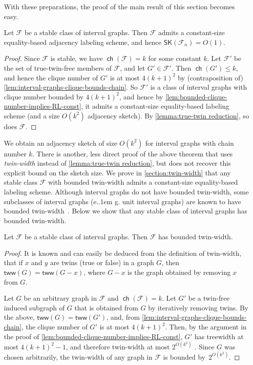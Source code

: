 \documentclass{theoretics}
\makeatletter
\newcommand{\cF}{\ensuremath{\mathcal{F}}}
\newcommand{\tw}{\mathsf{tww}}
\newcommand*\eg{e.\kern.1em g.\@\xspace} %
\newcommand{\RL}{\mathsf{SK}}
\DeclareMathOperator\ch{\mathsf{ch}}
\makeatother
\begin{document}
With these preparations, the proof of the main result of this section becomes easy.

\begin{theorem}
\label{thm:interval graphs}
Let $\cF$  be a stable class of interval graphs.
Then $\cF$ admits a constant-size equality-based adjacency labeling scheme, and hence $\RL(\cF_n) = O(1)$.
\end{theorem}
\begin{proof}
Since $\cF$ is stable, we have $\ch(\cF) = k$ for some constant $k$. Let $\cF'$ be the set of
true-twin-free members of $\cF$, and let $G' \in \cF'$. Then $\ch(G')\leq k$, and hence the clique
number of $G'$ is at most $4(k+1)^2$ by (contraposition of)
\cref{lem:interval-graphs-clique-bounds-chain}. So $\cF'$ is a class of interval graphs with clique
number bounded by $4(k+1)^2$, and hence by \cref{lem:bounded-clique-number-implies-RL-const}, it
admits a constant-size equality-based labeling scheme (and a size $O(k^2)$ adjacency sketch). By
\cref{lemma:true-twin reduction}, so does $\cF$.
\end{proof}

\begin{remark}
We obtain an adjacency sketch of size $O(k^2)$ for interval graphs with chain number $k$.  There is
another, less direct proof of the above theorem that uses \emph{twin-width} instead of
\cref{lemma:true-twin reduction}, but does not recover this explicit bound on the sketch size. We
prove in \cref{section:twin-width} that any stable class $\cF$ with bounded twin-width admits a
constant-size equality-based labeling scheme. Although interval graphs do not have bounded
twin-width, some subclasses of interval graphs (\eg unit interval graphs) are known to have
bounded twin-width~\cite{BKTW20}. Below we show that any stable class of interval graphs has bounded
twin-width. 
\end{remark}

\begin{proposition}
\label{prop:stable interval twin-width}
Let $\cF$ be a stable class of interval graphs. Then $\cF$ has bounded twin-width.
\end{proposition}
\begin{proof}
It is known and can easily be deduced from the definition of twin-width, that if $x$ and $y$ are twins (true or false) in a graph $G$, then $\tw(G) = \tw(G-x)$, where $G-x$ is the graph obtained by removing $x$ from $G$.

Let $G$ be an arbitrary graph in $\cF$ and $\ch(\cF) = k$. Let $G'$ be a twin-free induced subgraph of $G$ that is obtained from $G$ by iteratively removing twins. By the above, $\tw(G) = \tw(G')$, and, from \cref{lem:interval-graphs-clique-bounds-chain}, the clique number of $G'$ is at most $4(k+1)^2$. 
Then, by the argument in the proof of
\cref{lem:bounded-clique-number-implies-RL-const}, $G'$ has treewidth at most $4(k+1)^2-1$, and therefore twin-width at most $2^{O(k^2)}$ \cite{BD23}. Since $G$ was chosen arbitrarily, the twin-width of any graph in $\cF$ is bounded by~$2^{O(k^2)}$.
\end{proof}
\end{document}
